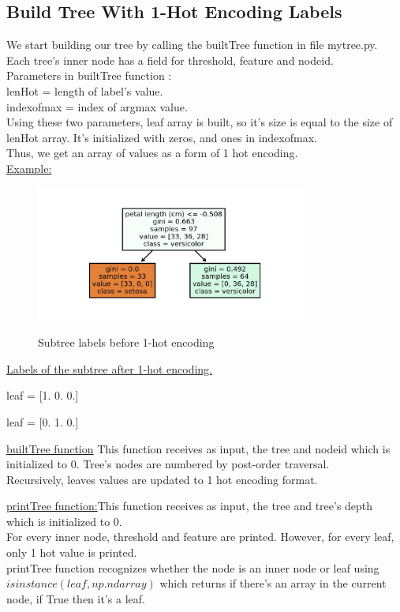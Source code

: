 \documentclass{article}
\begin{document}
\subsection{Build Tree With 1-Hot Encoding Labels}
We start building our tree by calling the builtTree function in file my\textunderscore tree.py.\\
Each tree's inner node has a field for threshold, feature and node\textunderscore id.\\
Parameters in builtTree function :\\
lenHot = length of label's value.\\
index\textunderscore of\textunderscore max = index of argmax value.\\
Using these two parameters, leaf array is built, so it's size is equal to the size of lenHot array. It's initialized with zeros, and ones in index\textunderscore of\textunderscore max.\\
Thus, we get an array of values as a form of 1 hot encoding.\\ 
\underline{Example:} \\


\begin{figure}[H]
\centering
\includegraphics[width=3.5in]{one hot.jpg}
\caption{}
\label{fig:label}{Subtree labels before 1-hot encoding}
\end{figure}

\centerline{ \underline{Labels of the subtree after 1-hot encoding. }}

\centerline{leaf =  [1. 0. 0.]}

\centerline{leaf =  [0. 1. 0.]}


\underline{builtTree function}
This function receives as input, the tree and node\textunderscore id which is initialized to 0. Tree's nodes are numbered by post-order traversal.\\
Recursively, leaves values are updated to 1 hot encoding format.\\
\par
\underline{printTree function:}This function receives as input, the tree and tree's depth which is initialized to 0.\\
For every inner node, threshold and feature are printed. However, for every leaf, only 1 hot value is printed.\\
printTree function recognizes whether the node is an inner node or leaf using \(isinstance(leaf, np.ndarray)\) which returns if there's an array in the current node, if True then it's a leaf.
\end{document}
